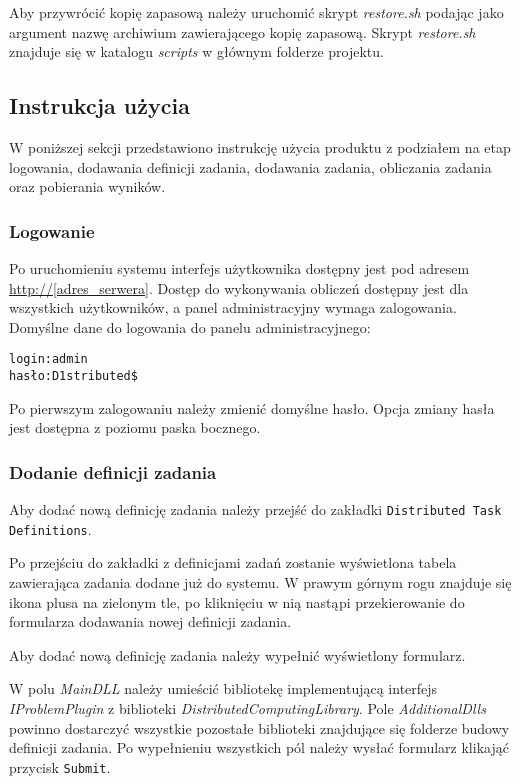 \documentclass[a4paper,11pt,twoside]{report}
\theoremstyle{definition}
\begin{document}
			Aby przywrócić kopię zapasową należy uruchomić skrypt \textit{restore.sh} podając jako argument nazwę archiwium zawierającego kopię zapasową. Skrypt \textit{restore.sh} znajduje się w katalogu \textit{scripts} w głównym folderze projektu.

    \subsection{Instrukcja użycia}
		W poniższej sekcji przedstawiono instrukcję użycia produktu z podziałem na etap logowania, dodawania definicji zadania, dodawania zadania, obliczania zadania oraz pobierania wyników.
		
		\subsubsection{Logowanie}
		
		Po uruchomieniu systemu interfejs użytkownika dostępny jest pod adresem \url{http://[adres_serwera]}. Dostęp do wykonywania obliczeń dostępny jest dla wszystkich użytkowników, a panel administracyjny wymaga zalogowania.
		Domyślne dane do logowania do panelu administracyjnego:

		\begin{alltt}
	login: admin
	hasło: D1stributed\$
		\end{alltt}


		Po pierwszym zalogowaniu należy zmienić domyślne hasło. Opcja zmiany hasła jest dostępna z poziomu paska bocznego.
		
		\subsubsection{Dodanie definicji zadania}
		\label{distributed-task-definition-add-guide}
		
		Aby dodać nową definicję zadania należy przejść do zakładki \texttt{Distributed Task Definitions}.
		
		Po przejściu do zakładki z definicjami zadań zostanie wyświetlona tabela zawierająca zadania dodane już do systemu. W prawym górnym rogu znajduje się ikona plusa na zielonym tle, po kliknięciu w nią nastąpi przekierowanie do formularza dodawania nowej definicji zadania.
		
		
		Aby dodać nową definicję zadania należy wypełnić wyświetlony formularz.
		
		
		W polu \textit{MainDLL} należy umieścić bibliotekę implementującą interfejs \textit{IProblemPlugin} z biblioteki \textit{DistributedComputingLibrary}. Pole \textit{AdditionalDlls} powinno dostarczyć wszystkie pozostałe biblioteki znajdujące się folderze budowy definicji zadania. Po wypełnieniu wszystkich pól należy wysłać formularz klikająć przycisk \texttt{Submit}.
		
\end{document}
